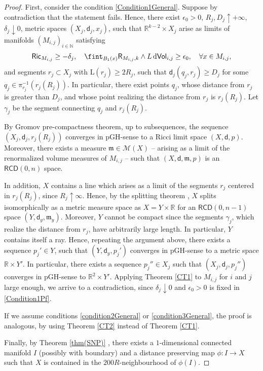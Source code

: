 \documentclass[10pt]{article}
\theoremstyle{definition}
\newcommand{\bb}[1]{\mathbb{#1}}
\newcommand{\ssf}[1]{\mathsf{#1}}
\newcommand{\RCD}{\mathsf{RCD}}
\newcommand{\length}{\mathrm{L}}
\newcommand{\sd}{\mathsf{d}}
\newcommand{\R}{\mathsf{R}}
\newcommand{\de}{{\rm d}}
\newcommand{\m}{\mathfrak{m}}
\begin{document}
    \begin{proof}
        First, consider the condition \eqref{Condition1General}. Suppose by contradiction that the statement fails. 
        Hence, there exist  $\epsilon_0>0$, $R_j,D_j \uparrow + \infty$, $\delta_j \downarrow 0$, metric spaces $(X_j,\sd_j,x_j)$, such that $\bb{R}^{k-2} \times X_j$ arise as limits of manifolds $(M_{i,j})_{i\in \bb{N}}$ satisfying 
         \begin{equation} \label{Condition1Pf}
    \ssf{Ric}_{M_{i,j}} \geq -\delta_j, \quad
     \fint_{B_1(x)} \R_{M_{i,j},k} \wedge L \,\de\ssf{Vol}_{i,j}  \geq \epsilon_0, \quad \forall x \in M_{i,j},
    \end{equation}
         and segments $r_j \subset X_j$ with $\length(r_j) \geq 2R_j$, such that $\sd_j(q_j,r_j) \geq D_j$ for some $q_j \in \pi_{r_j}^{-1}(r_j(R_j))$.
    In particular, there exist points $q_j$, whose distance from $r_j$ is greater than $D_j$, and whose point realizing the distance from $r_j$ is $r_j(R_j)$. Let $\gamma_j$ be the segment connecting $q_j$ and $r_j(R_j)$.

    By Gromov pre-compactness theorem, up to subsequences, the sequence  $(X_j,\sd_j,r_j(R_j))$ converges in pGH-sense to a Ricci limit space $(X,\sd,p)$. Moreover, there exists a measure $\m \in \mathcal{M}(X)$ -- arising as a limit of the renormalized volume measures of $M_{i,j}$ -- such that $(X,\sd,\m,p)$ is an $\RCD(0,n)$ space.
    
    In addition, $X$ contains a line which arises as a limit of the segments $r_j$ centered in $r_j(R_j)$, since $R_j \uparrow \infty$. 
    Hence, by the splitting theorem \cite{Gigli-Split}, $X$ splits isomorphically as a metric measure space as  $X=Y \times \bb{R}$  for an $\RCD(0,n-1)$ space $(Y,\sd_y,\m_y)$. Moreover, $Y$ cannot be compact since the segments $\gamma_j$, which realize the distance from $r_j$, have arbitrarily large length. 
    In particular, $Y$ contains itself a ray.
    Hence, repeating the argument above, there exists a sequence $p_j' \in Y$, such that $(Y,\sd_y,p_j')$ converges in pGH-sense to a metric space $\bb{R} \times Y'$. In particular, there exists a sequence $p_j'' \in X_j$ such that $(X_j,\sd_j,p_j'')$ converges in pGH-sense to $\bb{R}^2 \times Y'$. Applying  Theorem \ref{CT1} to $M_{i,j}$ for $i$ and $j$ large enough,  we arrive to a contradiction, since $\delta_j\downarrow 0$ and $\epsilon_0>0$ is fixed in \eqref{Condition1Pf}. 

    If we assume conditions \eqref{condition2General} or \eqref{condition3General}, the proof is analogous, by using Theorem \ref{CT2} instead of Theorem \ref{CT1}.

    Finally, by Theorem \ref{thm(SNP)}
    , there exists a $1$-dimensional connected manifold $I$ (possibly with boundary) and a distance preserving map $\phi:I \to X$ such that $X$ is contained in the $200R$-neighbourhood of $\phi(I)$.
    \end{proof}
\end{document}
